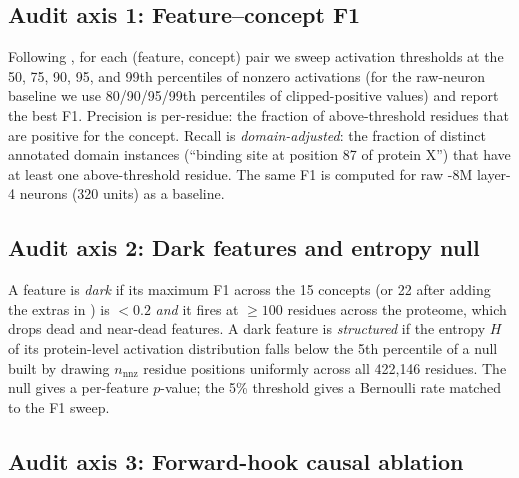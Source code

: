 \subsection{Audit axis 1: Feature--concept F1}
\label{ssec:f1}

Following \citet{simon2024interplm}, for each (feature, concept) pair we sweep activation thresholds at the 50, 75, 90, 95, and 99th percentiles of nonzero activations (for the raw-neuron baseline we use 80/90/95/99th percentiles of clipped-positive values) and report the best F1. Precision is per-residue: the fraction of above-threshold residues that are positive for the concept. Recall is \emph{domain-adjusted}: the fraction of distinct annotated domain instances (\eg ``binding site at position 87 of protein X'') that have at least one above-threshold residue. The same F1 is computed for raw \esm-8M layer-4 neurons (320 units) as a baseline.

\subsection{Audit axis 2: Dark features and entropy null}
\label{ssec:dark}

A feature is \emph{dark} if its maximum F1 across the 15 concepts (or 22 after adding the extras in ) is $< 0.2$ \emph{and} it fires at $\geq 100$ residues across the proteome, which drops dead and near-dead features. A dark feature is \emph{structured} if the entropy $H$ of its protein-level activation distribution falls below the 5th percentile of a null built by drawing $n_{\text{nnz}}$ residue positions uniformly across all 422{,}146 residues. The null gives a per-feature $p$-value; the 5\% threshold gives a Bernoulli rate matched to the F1 sweep.

\subsection{Audit axis 3: Forward-hook causal ablation}
\label{ssec:ablation}

